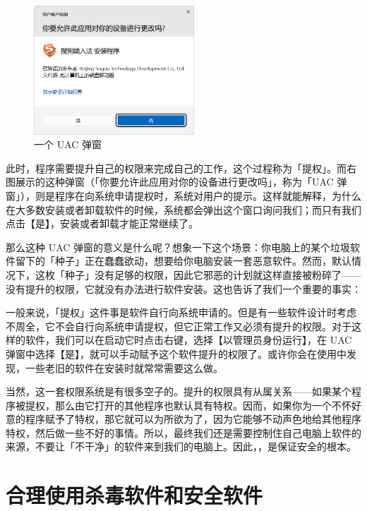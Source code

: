 \begin{figure}
  \centering
  \includegraphics[width=6cm]{assets/basic/UAC_popup.png}
  \caption{一个 UAC 弹窗}
  \label{fig:UAC_popup}
\end{figure}

此时，程序需要提升自己的权限来完成自己的工作，这个过程称为「提权」。而右图展示的这种弹窗（「你要允许此应用对你的设备进行更改吗」，称为「UAC 弹窗」），则是程序在向系统申请提权时，系统对用户的提示。这样就能解释，为什么在大多数安装或者卸载软件的时候，系统都会弹出这个窗口询问我们；而只有我们点击【是】，安装或者卸载才能正常继续了。

那么这种 UAC 弹窗的意义是什么呢？想象一下这个场景：你电脑上的某个垃圾软件留下的「种子」正在蠢蠢欲动，想要给你电脑安装一套恶意软件。然而，默认情况下，这枚「种子」没有足够的权限，因此它邪恶的计划就这样直接被粉碎了——没有提升的权限，它就没有办法进行软件安装。这也告诉了我们一个重要的事实：

一般来说，「提权」这件事是软件自行向系统申请的。但是有一些软件设计时考虑不周全，它不会自行向系统申请提权，但它正常工作又必须有提升的权限。对于这样的软件，我们可以在启动它时点击右键，选择【以管理员身份运行】，在 UAC 弹窗中选择【是】，就可以手动赋予这个软件提升的权限了。或许你会在使用中发现，一些老旧的软件在安装时就常常需要这么做。

当然，这一套权限系统是有很多空子的。提升的权限具有从属关系——如果某个程序被提权，那么由它打开的其他程序也默认具有特权。因而，如果你为一个不怀好意的程序赋予了特权，那它就可以为所欲为了，因为它能够不动声色地给其他程序特权，然后做一些不好的事情。所以，最终我们还是需要控制住自己电脑上软件的来源，不要让「不干净」的软件来到我们的电脑上。因此，，是保证安全的根本。

\section{合理使用杀毒软件和安全软件}

